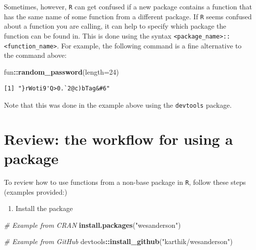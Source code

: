 \documentclass[
]{book}
\newenvironment{Shaded}{\begin{snugshade}}{\end{snugshade}}
\newcommand{\CommentTok}[1]{\textcolor[rgb]{0.56,0.35,0.01}{\textit{#1}}}
\newcommand{\DataTypeTok}[1]{\textcolor[rgb]{0.13,0.29,0.53}{#1}}
\newcommand{\DecValTok}[1]{\textcolor[rgb]{0.00,0.00,0.81}{#1}}
\newcommand{\KeywordTok}[1]{\textcolor[rgb]{0.13,0.29,0.53}{\textbf{#1}}}
\newcommand{\NormalTok}[1]{#1}
\newcommand{\OperatorTok}[1]{\textcolor[rgb]{0.81,0.36,0.00}{\textbf{#1}}}
\newcommand{\StringTok}[1]{\textcolor[rgb]{0.31,0.60,0.02}{#1}}
\providecommand{\tightlist}{%
  \setlength{\itemsep}{0pt}\setlength{\parskip}{0pt}}
\begin{document}
Sometimes, however, \texttt{R} can get confused if a new package contains a function that has the same name of some function from a different package. If \texttt{R} seems confused about a function you are calling, it can help to specify which package the function can be found in. This is done using the syntax \texttt{\textless{}package\_name\textgreater{}::\textless{}function\_name\textgreater{}}. For example, the following command is a fine alternative to the command above:

\begin{Shaded}
\begin{Highlighting}[]
\NormalTok{fun}\OperatorTok{::}\KeywordTok{random_password}\NormalTok{(}\DataTypeTok{length=}\DecValTok{24}\NormalTok{)}
\end{Highlighting}
\end{Shaded}

\begin{verbatim}
[1] "}rWoti9'Q>0.`2@c)bTag&#6"
\end{verbatim}

Note that this was done in the example above using the \texttt{devtools} package.

\hypertarget{review-the-workflow-for-using-a-package}{%
\section*{Review: the workflow for using a package}\label{review-the-workflow-for-using-a-package}}

To review how to use functions from a non-base package in \texttt{R}, follow these steps (examples provided:)

\begin{enumerate}
\def\labelenumi{\arabic{enumi}.}
\tightlist
\item
  Install the package
\end{enumerate}

\begin{Shaded}
\begin{Highlighting}[]
\CommentTok{# Example from CRAN}
\KeywordTok{install.packages}\NormalTok{(}\StringTok{"wesanderson"}\NormalTok{)}

\CommentTok{# Example from GitHub}
\NormalTok{devtools}\OperatorTok{::}\KeywordTok{install_github}\NormalTok{(}\StringTok{"karthik/wesanderson"}\NormalTok{)}
\end{Highlighting}
\end{Shaded}
\end{document}

